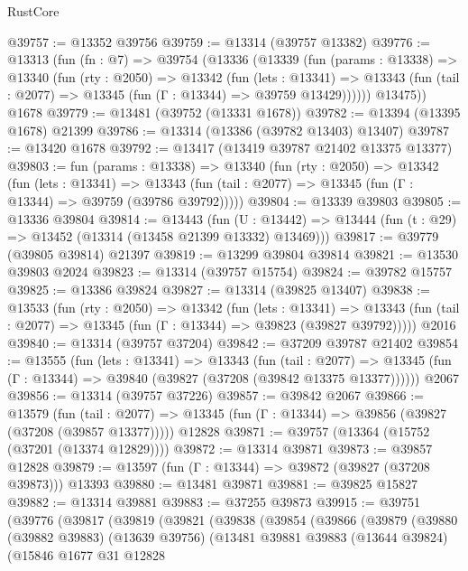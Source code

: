 \begin{lexlean}{RustCore}
\begin{coremodule}
@39757 := @13352 @39756
@39759 := @13314 (@39757 @13382)
@39776 := @13313
    (fun (fn : @7) =>
    @39754
      (@13336
        (@13339
          (fun (params : @13338) =>
          @13340
            (fun (rty : @2050) =>
            @13342
              (fun (lets : @13341) =>
              @13343 (fun (tail : @2077) => @13345 (fun (Γ : @13344) => @39759 @13429))))))
        @13475))
    @1678
@39779 := @13481 (@39752 (@13331 @1678))
@39782 := @13394 (@13395 @1678) @21399
@39786 := @13314 (@13386 (@39782 @13403) @13407)
@39787 := @13420 @1678
@39792 := @13417 (@13419 @39787 @21402 @13375 @13377)
@39803 := fun (params : @13338) =>
  @13340
    (fun (rty : @2050) =>
    @13342
      (fun (lets : @13341) =>
      @13343 (fun (tail : @2077) => @13345 (fun (Γ : @13344) => @39759 (@39786 @39792)))))
@39804 := @13339 @39803
@39805 := @13336 @39804
@39814 := @13443
    (fun (U : @13442) => @13444 (fun (t : @29) => @13452 (@13314 (@13458 @21399 @13332) @13469)))
@39817 := @39779 (@39805 @39814) @21397
@39819 := @13299 @39804 @39814
@39821 := @13530 @39803 @2024
@39823 := @13314 (@39757 @15754)
@39824 := @39782 @15757
@39825 := @13386 @39824
@39827 := @13314 (@39825 @13407)
@39838 := @13533
    (fun (rty : @2050) =>
    @13342
      (fun (lets : @13341) =>
      @13343 (fun (tail : @2077) => @13345 (fun (Γ : @13344) => @39823 (@39827 @39792)))))
    @2016
@39840 := @13314 (@39757 @37204)
@39842 := @37209 @39787 @21402
@39854 := @13555
    (fun (lets : @13341) =>
    @13343
      (fun (tail : @2077) =>
      @13345 (fun (Γ : @13344) => @39840 (@39827 (@37208 (@39842 @13375 @13377))))))
    @2067
@39856 := @13314 (@39757 @37226)
@39857 := @39842 @2067
@39866 := @13579
    (fun (tail : @2077) => @13345 (fun (Γ : @13344) => @39856 (@39827 (@37208 (@39857 @13377)))))
    @12828
@39871 := @39757 (@13364 (@15752 (@37201 (@13374 @12829))))
@39872 := @13314 @39871
@39873 := @39857 @12828
@39879 := @13597 (fun (Γ : @13344) => @39872 (@39827 (@37208 @39873))) @13393
@39880 := @13481 @39871
@39881 := @39825 @15827
@39882 := @13314 @39881
@39883 := @37255 @39873
@39915 := @39751
    (@39776
      (@39817
        (@39819
          (@39821
            (@39838
              (@39854
                (@39866
                  (@39879
                    (@39880
                      (@39882 @39883)
                      (@13639 @39756)
                      (@13481
                        @39881
                        @39883
                        (@13644 @39824)
                        (@15846
                          @1677
                          @31
                          @12828

\end{coremodule}
\end{lexlean}
